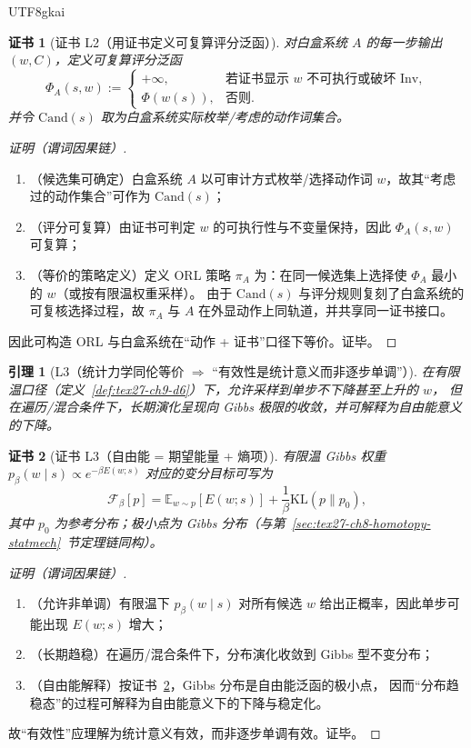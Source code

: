 \documentclass[12pt]{article}
\newtheorem{lemma}{引理}[section]
\newtheorem{Certificate}{证书}[section]
\begin{document}
\begin{CJK*}{UTF8}{gkai}
\begin{Certificate}[证书 L2（用证书定义可复算评分泛函）]
\label{cert:tex27-ch9-l2}
对白盒系统 $A$ 的每一步输出 $(w,C)$，定义可复算评分泛函
\[
  \Phi_A(s,w):=
  \begin{cases}
    +\infty, & \text{若证书显示 }w\text{ 不可执行或破坏 }\mathrm{Inv},\\
    \Phi(w(s)), & \text{否则}.
  \end{cases}
\]
并令 $\mathrm{Cand}(s)$ 取为白盒系统实际枚举/考虑的动作词集合。
\end{Certificate}

\begin{proof}[证明（谓词因果链）]
\begin{enumerate}
  \item（候选集可确定）白盒系统 $A$ 以可审计方式枚举/选择动作词 $w$，故其“考虑过的动作集合”可作为 $\mathrm{Cand}(s)$；
  \item（评分可复算）由证书可判定 $w$ 的可执行性与不变量保持，因此 $\Phi_A(s,w)$ 可复算；
  \item（等价的策略定义）定义 ORL 策略 $\pi_A$ 为：在同一候选集上选择使 $\Phi_A$ 最小的 $w$（或按有限温权重采样）。
  由于 $\mathrm{Cand}(s)$ 与评分规则复刻了白盒系统的可复核选择过程，故 $\pi_A$ 与 $A$ 在外显动作上同轨道，并共享同一证书接口。
\end{enumerate}
因此可构造 ORL 与白盒系统在“动作 + 证书”口径下等价。证毕。
\end{proof}

\begin{lemma}[L3（统计力学同伦等价 $\Rightarrow$ “有效性是统计意义而非逐步单调”）]
\label{lem:tex27-ch9-l3}
在有限温口径（定义~\ref{def:tex27-ch9-d6}）下，允许采样到单步不下降甚至上升的 $w$，
但在遍历/混合条件下，长期演化呈现向 Gibbs 极限的收敛，并可解释为自由能意义的下降。
\end{lemma}

\begin{Certificate}[证书 L3（自由能 = 期望能量 + 熵项）]
\label{cert:tex27-ch9-l3}
有限温 Gibbs 权重 $p_\beta(w\mid s)\propto e^{-\beta E(w;s)}$ 对应的变分目标可写为
\[
  \mathcal{F}_\beta[p]
  =\mathbb{E}_{w\sim p}[E(w;s)]+\frac{1}{\beta}\mathrm{KL}(p\|p_0),
\]
其中 $p_0$ 为参考分布；极小点为 Gibbs 分布（与第~\ref{sec:tex27-ch8-homotopy-statmech}~节定理链同构）。
\end{Certificate}

\begin{proof}[证明（谓词因果链）]
\begin{enumerate}
  \item（允许非单调）有限温下 $p_\beta(w\mid s)$ 对所有候选 $w$ 给出正概率，因此单步可能出现 $E(w;s)$ 增大；
  \item（长期趋稳）在遍历/混合条件下，分布演化收敛到 Gibbs 型不变分布；
  \item（自由能解释）按证书~\ref{cert:tex27-ch9-l3}，Gibbs 分布是自由能泛函的极小点，
  因而“分布趋稳态”的过程可解释为自由能意义下的下降与稳定化。
\end{enumerate}
故“有效性”应理解为统计意义有效，而非逐步单调有效。证毕。
\end{proof}


\end{CJK*}
\end{document}
